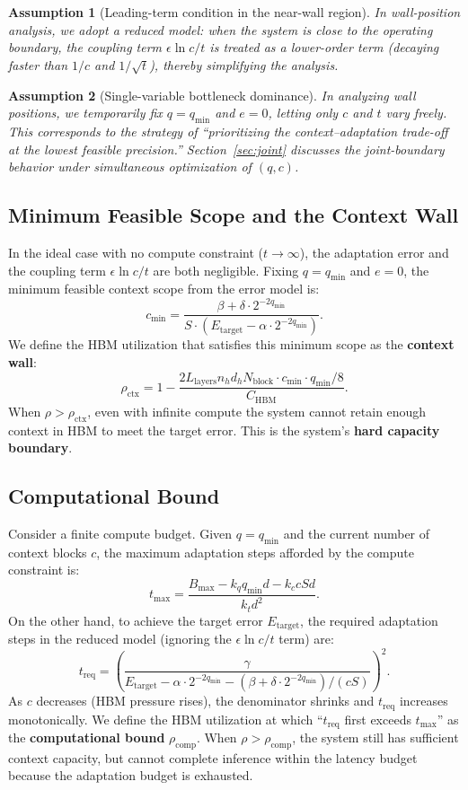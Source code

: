 \documentclass[11pt,a4paper]{article}
\theoremstyle{plain}
\newtheorem{assumption}{Assumption}
\theoremstyle{definition}
\begin{document}
\begin{assumption}[Leading-term condition in the near-wall region]\label{asm:leading}
In wall-position analysis, we adopt a reduced model: when the system is close to the operating boundary, the coupling term $\epsilon \ln c / t$ is treated as a lower-order term (decaying faster than $1/c$ and $1/\sqrt{t}$), thereby simplifying the analysis.
\end{assumption}

\begin{assumption}[Single-variable bottleneck dominance]\label{asm:single}
In analyzing wall positions, we temporarily fix $q = q_{\min}$ and $e = 0$, letting only $c$ and $t$ vary freely. This corresponds to the strategy of ``prioritizing the context--adaptation trade-off at the lowest feasible precision.'' Section~\ref{sec:joint} discusses the joint-boundary behavior under simultaneous optimization of $(q,c)$.
\end{assumption}

\subsection{Minimum Feasible Scope and the Context Wall}

In the ideal case with no compute constraint ($t \to \infty$), the adaptation error and the coupling term $\epsilon \ln c / t$ are both negligible. Fixing $q = q_{\min}$ and $e = 0$, the minimum feasible context scope from the error model is:
\[
c_{\min} = \frac{\beta + \delta \cdot 2^{-2q_{\min}}}{S \cdot (E_{\text{target}} - \alpha \cdot 2^{-2q_{\min}})}.
\]
We define the HBM utilization that satisfies this minimum scope as the \textbf{context wall}:
\[
\rho_{\text{ctx}} = 1 - \frac{2 L_{\text{layers}} n_h d_h N_{\text{block}} \cdot c_{\min} \cdot q_{\min} / 8}{C_{\text{HBM}}}.
\]
When $\rho > \rho_{\text{ctx}}$, even with infinite compute the system cannot retain enough context in HBM to meet the target error. This is the system's \textbf{hard capacity boundary}.

\subsection{Computational Bound}

Consider a finite compute budget. Given $q = q_{\min}$ and the current number of context blocks $c$, the maximum adaptation steps afforded by the compute constraint is:
\[
t_{\max} = \frac{B_{\max} - k_q q_{\min} d - k_c c S d}{k_t d^2}.
\]
On the other hand, to achieve the target error $E_{\text{target}}$, the required adaptation steps in the reduced model (ignoring the $\epsilon \ln c / t$ term) are:
\[
t_{\text{req}} = \left( \frac{\gamma}{E_{\text{target}} - \alpha \cdot 2^{-2q_{\min}} - (\beta + \delta \cdot 2^{-2q_{\min}}) / (c S)} \right)^2.
\]
As $c$ decreases (HBM pressure rises), the denominator shrinks and $t_{\text{req}}$ increases monotonically. We define the HBM utilization at which ``$t_{\text{req}}$ first exceeds $t_{\max}$'' as the \textbf{computational bound} $\rho_{\text{comp}}$. When $\rho > \rho_{\text{comp}}$, the system still has sufficient context capacity, but cannot complete inference within the latency budget because the adaptation budget is exhausted.
\end{document}
